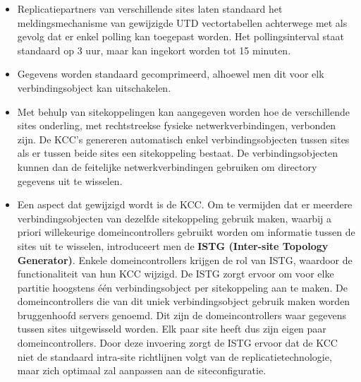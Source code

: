 \begin{enumerate}
		 { 
			\begin{itemize}
				\item Replicatiepartners van verschillende sites laten standaard het meldingsmechanisme van gewijzigde UTD vectortabellen achterwege met als gevolg dat er enkel polling kan toegepast worden. Het pollingsinterval staat standaard op 3 uur, maar kan ingekort worden tot 15 minuten.
				\item Gegevens worden standaard gecomprimeerd, alhoewel men dit voor elk verbindingsobject kan uitschakelen.
				\item Met behulp van sitekoppelingen kan aangegeven worden hoe de verschillende sites onderling, met rechtstreekse fysieke netwerkverbindingen, verbonden zijn. De KCC's genereren automatisch enkel verbindingsobjecten tussen sites als er tussen beide sites een sitekoppeling bestaat. De verbindingsobjecten kunnen dan de feitelijke netwerkverbindingen gebruiken om directory gegevens uit te wisselen. 
				\item Een aspect dat gewijzigd wordt is de KCC. Om te vermijden dat er meerdere verbindingsobjecten van dezelfde sitekoppeling gebruik maken, waarbij a priori willekeurige domeincontrollers gebruikt worden om informatie tussen de sites uit te wisselen, introduceert men de \textbf{ISTG (Inter-site Topology Generator)}. Enkele domeincontrollers krijgen de rol van ISTG, waardoor de functionaliteit van hun KCC wijzigd. De ISTG zorgt ervoor om voor elke partitie hoogstens één verbindingsobject per sitekoppeling aan te maken. De domeincontrollers die van dit uniek verbindingsobject gebruik maken worden bruggenhoofd servers genoemd. Dit zijn de domeincontrollers waar gegevens tussen sites uitgewisseld worden. Elk paar site heeft dus zijn eigen paar domeincontrollers. Door deze invoering zorgt de ISTG ervoor dat de KCC niet de standaard intra-site richtlijnen volgt van de replicatietechnologie, maar zich optimaal zal aanpassen aan de siteconfiguratie.
			\end{itemize}


		}
		

\end{enumerate}
